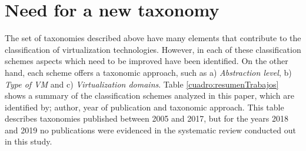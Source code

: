 	\section {Need for a new taxonomy}\label{sec:necesidadDeUnaTaxonomia}
	
	The set of taxonomies described above have many elements that contribute to the classification of virtualization technologies. However, in each of these classification schemes aspects which need to be improved have been identified. On the other hand, each scheme offers a taxonomic approach, such as a) \textit{Abstraction level}, b) \textit{Type of VM} and c) \textit{Virtualization domains}. Table \ref{cuadro:resumenTrabajos} shows a summary of the classification schemes analyzed in this paper, which are identified by; author, year of publication and taxonomic approach. This table describes taxonomies published between 2005 and 2017, but for the years 2018 and 2019 no publications were evidenced in the systematic review conducted out in this study.
	
	
	

